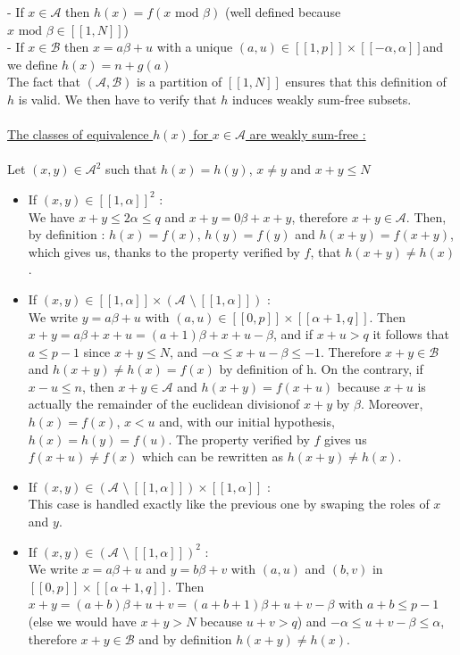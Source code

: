 - If \(x \in \mathcal{A}\) then \(h(x) = f(x \text{ mod } \beta)\) (well defined because \(x \text{ mod } \beta \in
[\![1,N]\!]\))\\
- If \(x \in \mathcal{B}\) then \(x = a\beta + u\) with a unique \((a,u) \in [\![1,p]\!] \times
[\![-\alpha,\alpha]\!]\)and we define \(h(x) = n + g(a)\)\\
The fact that \((\mathcal{A}, \mathcal{B})\) is a partition of \([\![1,N]\!]\) ensures that this definition of \(h\) is
valid. We then have to verify that \(h\) induces weakly sum-free subsets.\\
\\
\underline{The classes of equivalence \(h(x)\) for \(x \in \mathcal{A}\) are weakly sum-free :}
\\
\\
Let \((x,y) \in \mathcal{A}^2\) such that \(h(x) = h(y)\), \(x \neq y\) and \(x + y \leqslant N\)
\begin{itemize}
	\item If \((x,y) \in [\![1,\alpha]\!]^2\) :\\
	We have \(x + y \leqslant 2\alpha \leqslant q\) and \(x + y = 0\beta + x + y\), therefore \(x + y \in \mathcal{A}\).
Then, by definition : \(h(x) = f(x)\), \(h(y) = f(y)\) and \(h(x+y) = f(x+y)\), which gives us, thanks to the property
verified by \(f\), that \(h(x+y) \neq h(x)\).
	\item If \((x,y) \in [\![1,\alpha]\!] \times ( \mathcal{A} \text{ \textbackslash} ~ [\![1,\alpha]\!] )\) :\\
We write \(y = a\beta + u\) with \((a,u) \in [\![0,p]\!] \times [\![\alpha + 1,q]\!]\). Then \(x+y = a\beta + x + u =
(a+1)\beta + x + u - \beta\),
and if \(x + u > q\) it follows that \(a \leqslant p-1\) since \(x+y \leqslant N\), and \(-\alpha \leqslant x + u -
\beta \leqslant -1\).
Therefore \(x+y \in \mathcal{B}\) and \(h(x+y) \neq h(x) = f(x)\) by definition of h. On the contrary, if \(x - u
\leqslant n\),
then \(x+y \in \mathcal{A}\) and \(h(x+y) = f(x+u)\) because \(x+u\) is actually the remainder of the euclidean
divisionof \(x+y\) by \(\beta\).
Moreover, \(h(x) = f(x)\), \(x < u\) and, with our initial hypothesis, \(h(x) = h(y) = f(u)\). The property verified by
\(f\) gives us \(f(x+u) \neq f(x)\) which can be rewritten as \(h(x+y) \neq h(x)\).
	\item If \((x,y) \in ( \mathcal{A} \text{ \textbackslash} ~ [\![1,\alpha]\!] ) \times [\![1,\alpha]\!]\) : \\
	This case is handled exactly like the previous one by swaping the roles of \(x\) and \(y\).
	\item If \((x,y) \in ( \mathcal{A} \text{ \textbackslash} ~ [\![1,\alpha]\!] )^2\) : \\
We write \(x = a\beta + u\) and \(y = b\beta + v\) with \((a,u)\) and \((b,v)\) in \([\![0,p]\!] \times [\![\alpha +
1,q]\!]\). Then \(x+y = (a+b)\beta + u+v = (a+b+1)\beta + u + v - \beta\)
with \(a+b \leqslant p-1\) (else we would have \(x+y > N\) because \(u+v > q\)) and \(-\alpha \leqslant u + v - \beta
\leqslant \alpha\), therefore \(x+y \in \mathcal{B}\) and by definition \(h(x+y) \neq h(x)\).
\end{itemize}
